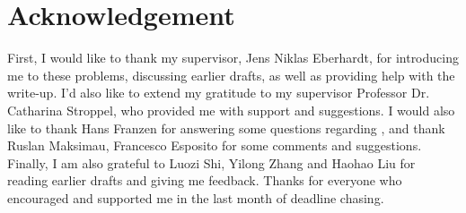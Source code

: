 \section*{Acknowledgement}
First, I would like to thank my supervisor, Jens Niklas Eberhardt, for introducing me to these problems, discussing earlier drafts, as well as providing help with the write-up.  I’d also like to extend my gratitude to my supervisor Professor Dr. Catharina Stroppel, who provided me with support and suggestions. I would also like to thank Hans Franzen for answering some questions regarding \cite{irelli2019cell}, and thank Ruslan Maksimau, Francesco Esposito for some comments and suggestions. Finally, I am also grateful to Luozi Shi, Yilong Zhang and Haohao Liu for reading earlier drafts and giving me feedback. Thanks for everyone who encouraged and supported me in the last month of deadline chasing.
